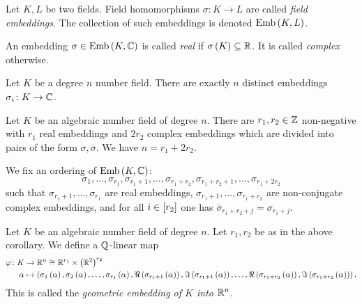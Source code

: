 \documentclass[11pt]{article}
\begin{document}
\begin{definition}
Let $K,L$ be two fields. Field homomorphisms $\sigma \colon K \to L$ are called \emph{field embeddings}.
The collection of such embeddings is denoted
$\mathrm{Emb}\left( K,L \right)$.
\end{definition}

\begin{definition}
An embedding $\sigma \in \mathrm{Emb}\left( K,\mathbb{C} \right)$ is called \emph{real} if $\sigma\left( K \right) \subseteq \mathbb{R}$.
It is called \emph{complex} otherwise.
\end{definition}

\begin{theorem}
Let $K$ be a degree $n$ number field. There are exactly $n$ distinct embeddings $\sigma_i \colon K \to \mathbb{C}$.
\end{theorem}

\begin{corollary}
Let $K$ be an algebraic number field of degree $n$.
There are $r_1, r_2 \in \mathbb{Z}$ non-negative with $r_1$ real embeddings and $2 r_2$ complex embeddings which are divided into pairs of the form $\sigma, \bar{\sigma}$. We have $n = r_1 + 2 r_2$.

We fix an ordering of $\mathrm{Emb}\left( K,\mathbb{C} \right)$:
\[\sigma_1, \ldots, \sigma_{r_1}, \sigma_{r_1 + 1}, \ldots, \sigma_{r_1 + r_2}, \sigma_{r_1 + r_2 + 1}, \ldots, \sigma_{r_1 + 2 r_2}\]
such that $\sigma_{r_1 + 1}, \ldots, \sigma_{r_1}$ are real embeddings, $\sigma_{r_1 + 1}, \ldots, \sigma_{r_1 + r_2}$ are non-conjugate complex embeddings, and for all $i \in \left[ r_2 \right]$ one has $\bar{\sigma}_{r_1 + r_2 + j} = \sigma_{r_1 + j}$.
\end{corollary}

\begin{definition}
Let $K$ be an algebraic number field of degree $n$. Let $r_1, r_2$ be as in the above corollary.
We define a $\mathbb{Q}$-linear map
\begin{align*}
\varphi \colon K &\to \mathbb{R}^n \cong \mathbb{R}^{r_1} \times \left( \mathbb{R}^2 \right)^{r_2} \\
\alpha &\mapsto \left( \sigma_1\left( \alpha \right), \sigma_2\left( \alpha \right), \ldots, \sigma_{r_1}\left( \alpha \right), \Re\left( \sigma_{r_1 + 1}\left( \alpha \right) \right), \Im\left( \sigma_{r_1 + 1}\left( \alpha \right) \right), \ldots, \Re\left( \sigma_{r_1 + r_2}\left( \alpha \right) \right), \Im\left( \sigma_{r_1 + r_2}\left( \alpha \right) \right) \right) \text{.}
\end{align*}
This is called the \emph{geometric embedding of $K$ into $\mathbb{R}^n$}.
\end{definition}
\end{document}
